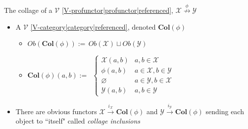 
The collage of a $\mathcal{V}$ \ref{V-profunctor|profunctor|referenced}, $\mathcal{X}\overset{\phi}\nrightarrow \mathcal{Y}$

\begin{itemize}
    \item A $\mathcal{V}$ \ref{V-category|category|referenced}, denoted $\mathbf{Col}(\phi)$
          \begin{itemize}
            \item $Ob(\mathbf{Col}(\phi)):=$\,$Ob(\mathcal{X})\sqcup Ob(\mathcal{Y})$\,
            \item $\mathbf{Col}(\phi)(a,b) :=$ \,$\begin{cases}\mathcal{X}(a,b) & a,b \in \mathcal{X} \\ \phi(a,b)& a \in \mathcal{X}, b \in \mathcal{Y} \\ \varnothing & a \in \mathcal{Y}, b \in \mathcal{X} \\ \mathcal{Y}(a,b) & a,b \in \mathcal{Y} \end{cases}$\,
          \end{itemize}
    \item There are obvious functors $\mathcal{X}\xrightarrow{i_\mathcal{X}}\mathbf{Col}(\phi)$ and $\mathcal{Y}\xrightarrow{i_\mathcal{Y}}\mathbf{Col}(\phi)$ sending each object to ``itself" called \emph{collage inclusions}

  \end{itemize}
